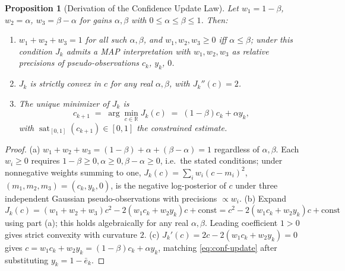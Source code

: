 \documentclass[letterpaper, 10 pt, conference]{ieeeconf}
\newtheorem{proposition}{Proposition}
\begin{document}
\begin{proposition}[Derivation of the Confidence Update Law]
\label{prop:derivation}
Let $w_1=1-\beta$, $w_2=\alpha$, $w_3=\beta-\alpha$ for gains $\alpha,\beta$ with $0\le\alpha\le\beta\le1$. Then:
\begin{enumerate}
\item[(a)] $w_1+w_2+w_3=1$ for all such $\alpha,\beta$, and $w_1,w_2,w_3\ge0$ iff $\alpha\le\beta$; under this condition $J_k$ admits a MAP interpretation with $w_1,w_2,w_3$ as relative precisions of pseudo-observations $c_k$, $y_k$, $0$.
\item[(b)] $J_k$ is strictly convex in $c$ for any real $\alpha,\beta$, with $J_k''(c)=2$.
\item[(c)] The unique minimizer of $J_k$ is
\begin{equation}
c_{k+1} \;=\; \arg\min_{c\in\mathbb R} J_k(c) \;=\; (1-\beta)c_k+\alpha y_k, \label{eq:conf-update}
\end{equation}
with $\operatorname{sat}_{[0,1]}(c_{k+1})\in[0,1]$ the constrained estimate.
\end{enumerate}
\end{proposition}
\begin{proof}
(a) $w_1+w_2+w_3=(1-\beta)+\alpha+(\beta-\alpha)=1$ regardless of $\alpha,\beta$. Each $w_i\ge0$ requires $1-\beta\ge0,\alpha\ge0,\beta-\alpha\ge0$, i.e.\ the stated conditions; under nonnegative weights summing to one, $J_k(c)=\sum_i w_i(c-m_i)^2$, $(m_1,m_2,m_3)=(c_k,y_k,0)$, is the negative log-posterior of $c$ under three independent Gaussian pseudo-observations with precisions $\propto w_i$.
(b) Expand $J_k(c)=(w_1+w_2+w_3)c^2-2(w_1c_k+w_2y_k)c+\text{const}=c^2-2(w_1c_k+w_2y_k)c+\text{const}$ using part (a); this holds algebraically for any real $\alpha,\beta$. Leading coefficient $1>0$ gives strict convexity with curvature $2$.
(c) $J_k'(c)=2c-2(w_1c_k+w_2y_k)=0$ gives $c=w_1c_k+w_2y_k=(1-\beta)c_k+\alpha y_k$, matching \eqref{eq:conf-update} after substituting $y_k=1-\bar e_k$.
\end{proof}
\end{document}
